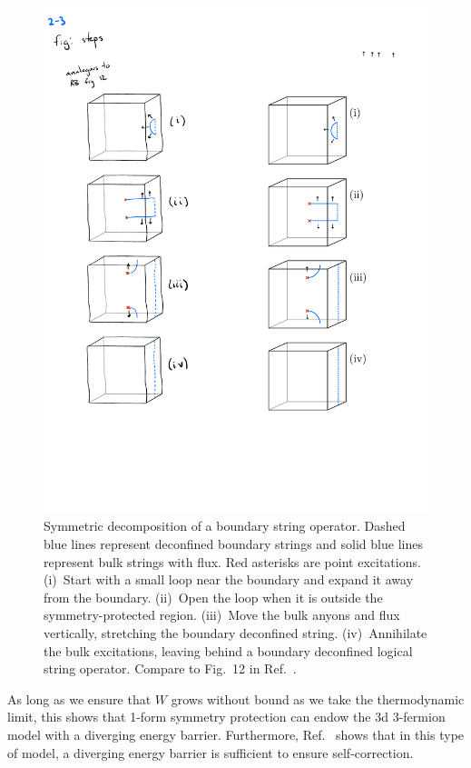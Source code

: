 \documentclass[twocolumn, longbibliography]{revtex4-2}
\begin{document}
\begin{figure}
\centering
\includegraphics{steps}
\caption{Symmetric decomposition of a boundary string operator. Dashed blue lines represent deconfined boundary strings and solid blue lines represent bulk strings with flux. Red asterisks are point excitations. (i)~Start with a small loop near the boundary and expand it away from the boundary. (ii)~Open the loop when it is outside the symmetry-protected region. (iii)~Move the bulk anyons and flux vertically, stretching the boundary deconfined string. (iv)~Annihilate the bulk excitations, leaving behind a boundary deconfined logical string operator. Compare to Fig.~12 in Ref.~\cite{RobertsBartlett}.}
\label{fig:steps}
\end{figure}
	
As long as we ensure that $W$ grows without bound as we take the thermodynamic limit, this shows that 1-form symmetry protection can endow the 3d 3-fermion model with a diverging energy barrier. Furthermore, Ref.~\cite{RobertsBartlett} shows that in this type of model, a diverging energy barrier is sufficient to ensure self-correction.
\end{document}
